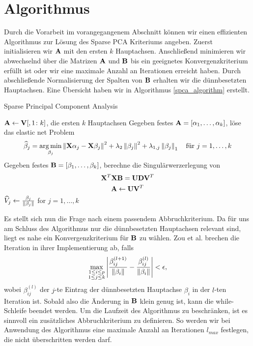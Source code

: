 

\section{Algorithmus}

Durch die Vorarbeit im vorangegangenem Abschnitt können wir einen effizienten Algorithmus zur Lösung des Sparse PCA Kriteriums angeben. Zuerst initialisieren wir $\mathbf{A}$ mit den ersten $k$ Hauptachsen. Anschließend minimieren wir abwechselnd über die Matrizen $\mathbf{A}$ und $\mathbf{B}$ bis ein geeignetes Konvergenzkriterium erfüllt ist oder wir eine maximale Anzahl an Iterationen erreicht haben. Durch abschließende Normalisierung der Spalten von $\mathbf{B}$ erhalten wir die dünnbesetzten Hauptachsen. Eine Übersicht haben wir in Algorithmus \ref{spca_algorithm} erstellt.

\begin{algorithm}[tbh]
    \caption{Sparse Principal Component Analysis}
    \label{spca_algorithm}
    \begin{algorithmic}[1]
        	\State $\mathbf{A} \gets \mathbf{V}[,1 \colon k]$, die ersten $k$ Hauptachsen
                \State Gegeben festes $\mathbf{A} = [\alpha_1, \ldots, \alpha_k]$, löse das elastic net Problem
                $$\widehat{\beta}_j = \operatorname*{arg\,min}_{\beta_j} \left\lVert \mathbf{X} \alpha_j - \mathbf{X} \beta_j \right\rVert^{2} + \lambda_2 \left\lVert \beta_j \right\rVert^2 + \lambda_{1,j}\left\lVert \beta_j \right\rVert_{1} \quad \text{für } j = 1, \ldots, k$$
                \State Gegeben festes $\mathbf{B} = [\beta_1, \ldots, \beta_k]$, berechne die Singulärwerzerlegung von $$\mathbf{X}^T \mathbf{X} \mathbf{B} = \mathbf{U} \mathbf{D} \mathbf{V}^T$$
                $$\mathbf{A} \gets \mathbf{U} \mathbf{V}^T$$
            \EndWhile
            \State $\widehat{V}_j \gets \frac{\beta_j}{\left\lVert \beta_j \right\rVert}$ for $j = 1, \ldots, k$
        \EndProcedure
    \end{algorithmic}
\end{algorithm} 

Es stellt sich nun die Frage nach einem passendem Abbruchkriterium. Da für uns am Schluss des Algorithmus nur die dünnbesetzten Hauptachsen relevant sind, liegt es nahe ein Konvergenzkriterium für $\mathbf{B}$ zu wählen. Zou et al. brechen die Iteration in ihrer Implementierung ab, falls
$$\max_{\substack{1 \leq i \leq p \\ 1 \leq j \leq k}} \left| \frac{\beta_{ij}^{(l+1)}}{\left\lVert \beta_i \right\rVert} - \frac{\beta_{ij}^{(l)}}{\left\lVert \beta_i \right\rVert} \right| < \epsilon ,$$
wobei $\beta_{ij}^{(l)}$ der $j$-te Eintrag der dünnbesetzten Hauptachse $\beta_i$ in der $l$-ten Iteration ist. Sobald also die Änderung in $\mathbf{B}$ klein genug ist, kann die while-Schleife beendet werden. Um die Laufzeit des Algorithmus zu beschränken, ist es sinnvoll ein zusätzliches Abbruchkriterium zu definieren. So werden wir bei Anwendung des Algorithmus eine maximale Anzahl an Iterationen $l_{max}$ festlegen, die nicht überschritten werden darf.


